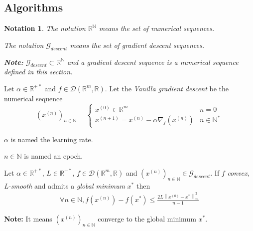 \documentclass[11pt,en]{elegantpaper}
\newtheorem{notation}{Notation}
\newcommand{\norm}[1]{\left\lVert#1\right\rVert}
\newcommand{\Real}{\mathbb{R}}
\begin{document}
\subsection{Algorithms}

\begin{notation}
  The notation $\Real^{\mathbb{N}}$ means the set of numerical sequences. \par
  The notation $\mathcal{G}_{descent}$ means the set of gradient descent sequences. \par
  \textbf{Note:} $\mathcal{G}_{descent} \subset \Real^{\mathbb{N}}$ and a gradient descent sequence is a
  numerical sequence defined in this section.
\end{notation}

\begin{definition}
  Let $\alpha \in \Real^{+*}$ and $f \in \mathcal{D}(\Real^m,\Real)$. Let the \textit{Vanilla gradient descent}
  be the numerical sequence \begin{equation*}
    (x^{(n)})_{n \in \mathbb{N}} = \left\{
      \begin{array}{ll}
        x^{(0)} \in \Real^m & n = 0 \\
        x^{(n+1)} = x^{(n)} - \alpha \nabla_f(x^{(n)}) & n \in \mathbb{N}^*
      \end{array}
    \right.
  \end{equation*} \par

  $\alpha$ is named the learning rate. \par
  $n \in \mathbb{N}$ is named an epoch.
\end{definition}

\begin{proposition}
  {\normalfont
    Let $\alpha \in \Real^{+*}$, $L \in \Real^{+*}$, $f \in \mathcal{D}(\Real^m,\Real)$ and $(x^{(n)})_{n \in \mathbb{N}} \in \mathcal{G}_{descent}$.
    If $f$ \textit{convex}, \textit{L-smooth} and admits a \textit{global minimum} $x^*$ then \begin{equation*}
      \begin{gathered}
        \forall n \in \mathbb{N}, f(x^{(n)}) - f(x^*) \leq \frac{2L\norm{x^{(0)} - x^*}^2_m}{n - 1}
      \end{gathered}
    \end{equation*}
  
    \textbf{Note:} It means $(x^{(n)})_{n \in \mathbb{N}}$ converge to the global minimum $x^*$.
  }
\end{proposition}
\end{document}
